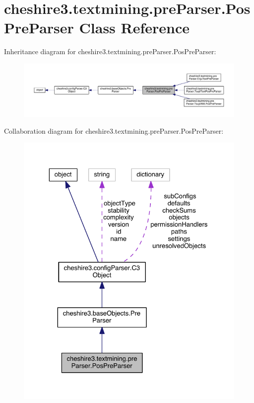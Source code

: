 \hypertarget{classcheshire3_1_1textmining_1_1pre_parser_1_1_pos_pre_parser}{\section{cheshire3.\-textmining.\-pre\-Parser.\-Pos\-Pre\-Parser Class Reference}
\label{classcheshire3_1_1textmining_1_1pre_parser_1_1_pos_pre_parser}
}


Inheritance diagram for cheshire3.\-textmining.\-pre\-Parser.\-Pos\-Pre\-Parser\-:
\nopagebreak
\begin{figure}[H]
\begin{center}
\leavevmode
\includegraphics[width=350pt]{classcheshire3_1_1textmining_1_1pre_parser_1_1_pos_pre_parser__inherit__graph}
\end{center}
\end{figure}


Collaboration diagram for cheshire3.\-textmining.\-pre\-Parser.\-Pos\-Pre\-Parser\-:
\nopagebreak
\begin{figure}[H]
\begin{center}
\leavevmode
\includegraphics[width=325pt]{classcheshire3_1_1textmining_1_1pre_parser_1_1_pos_pre_parser__coll__graph}
\end{center}
\end{figure}
